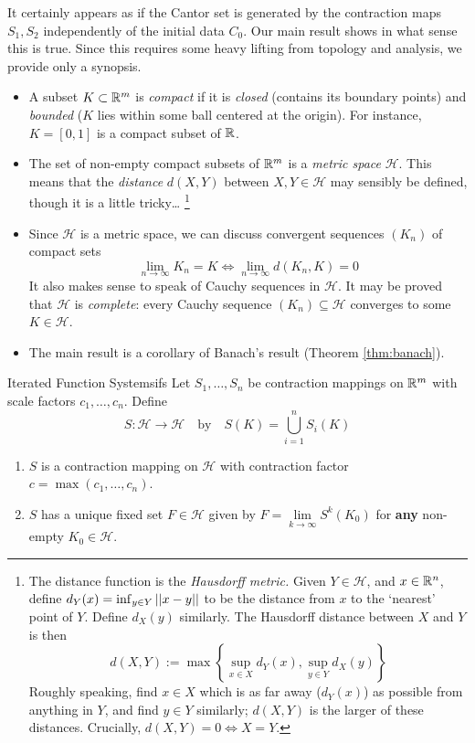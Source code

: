 It certainly appears as if the Cantor set is generated by the contraction maps $S_1,S_2$ independently of the initial data $C_0$. Our main result shows in what sense this is true. Since this requires some heavy lifting from topology and analysis, we provide only a synopsis.

\begin{itemize}
  \item A subset $K\subset\mathbb{R}^m$ is \emph{compact} if it is \emph{closed} (contains its boundary points) and \emph{bounded} ($K$ lies within some ball centered at the origin). For instance, $K=[0,1]$ is a compact subset of $\mathbb{R}$.
  
  \item The set of non-empty compact subsets of $\mathbb{R}^m$ is a \emph{metric space} $\mathcal H$. This means that the \emph{distance} $d(X,Y)$ between $X,Y\in\mathcal H$ may sensibly be defined, though it is a little tricky\ldots%
  \footnote{%
  	The distance function is the \emph{Hausdorff metric.} Given $Y\in\mathcal H$, and $x\in \mathbb{R}^n$, define $d_Y(x)=\inf_{y\in Y}\left| \left| x-y\right|\right|$ to be the distance from $x$ to the `nearest' point of $Y$. Define $d_X(y)$ similarly. The Hausdorff distance between $X$ and $Y$ is then
  	\[
  		d(X,Y):=\max\left\{\sup_{x\in X}d_Y(x),\sup_{y\in Y}d_X(y)\right\}
  	\]
  	Roughly speaking, find $x\in X$ which is as far away ($d_Y(x)$) as possible from anything in $Y$, and find $y\in Y$ similarly; $d(X,Y)$ is the larger of these distances. Crucially, $d(X,Y)=0\Longleftrightarrow X=Y$.
  }
  
  \item Since $\mathcal H$ is a metric space, we can discuss convergent sequences $(K_n)$ of compact sets
	\[
		\lim_{n\to\infty}K_n=K\iff \lim_{n\to\infty}d(K_n,K)=0
	\]
	It also makes sense to speak of Cauchy sequences in $\mathcal H$. It may be proved that $\mathcal H$ is \emph{complete}: every Cauchy sequence $(K_n)\subseteq\mathcal H$ converges to some $K\in\mathcal H$.
	
  \item The main result is a corollary of Banach's result (Theorem \ref{thm:banach}).
\end{itemize}


\begin{thm}{Iterated Function Systems}{ifs}
	Let $S_1,\ldots,S_n$ be contraction mappings on $\mathbb{R}^m$ with scale factors $c_1,\ldots,c_n$. Define
	\[
		S:\mathcal H\to\mathcal H\quad\text{by}\quad S(K)=\bigcup_{i=1}^nS_i(K)
	\]
	\begin{enumerate}
	  \item $S$ is a contraction mapping on $\mathcal H$ with contraction factor $c=\max(c_1,\ldots,c_n)$.
	  \item $S$ has a unique fixed set $F\in\mathcal H$ given by $F=\lim\limits_{k\to\infty} S^k(K_0)$ for \textbf{any} non-empty $K_0\in\mathcal H$.
	\end{enumerate}
\end{thm}

